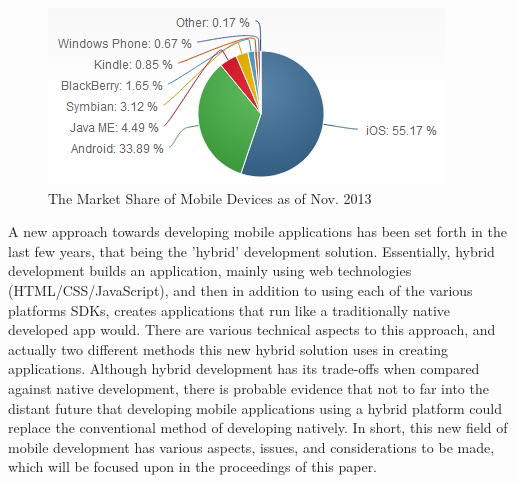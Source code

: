 \documentclass[11pt, twocolumn]{article}
\begin{document}
\begin{figure}[h!]
\includegraphics[scale=0.8]{mobile-market-share}
\caption{The Market Share of Mobile Devices as of Nov. 2013  ~\cite{NetMarketShare2013}}
\end{figure}

A new approach towards developing mobile applications has been set forth in the last few years, that being the 'hybrid' development solution.  Essentially, hybrid development builds an application, mainly using web technologies (HTML/CSS/JavaScript), and then in addition to using each of the various platforms SDKs, creates applications that run like a traditionally native developed app would.  There are various technical aspects to this approach, and actually two different methods this new hybrid solution uses in creating applications. Although hybrid development has its trade-offs when compared against native development, there is probable evidence that not to far into the distant future that developing mobile applications using a hybrid platform could replace the conventional method of developing natively.  In short, this new field of mobile development has various aspects, issues, and considerations to be made, which will be focused upon in the proceedings of this paper.\\
\end{document}
